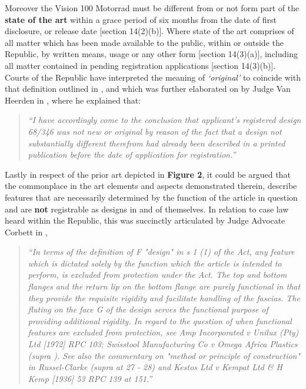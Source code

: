 \documentclass[11pt]{article}
\begin{document}
Moreover the Vision 100 Motorrad must be different from or not form part of the
\textbf{state of the art} within a grace period of six months from the date of first
disclosure, or release date [section 14(2)(b)]\cite{rsa93_designs_act}. Where
state of the art comprises of all matter which has been made available to the
public, within or outside the Republic, by written means, usage or any other
form [section 14(3)(a)]\cite{rsa93_designs_act}, including all matter contained in
pending registration applications [section 14(3)(b)]\cite{rsa93_designs_act}.\\

Courts of the Republic have interpreted the meaning of \emph{`original'} to coincide
with that definition outlined in \cite{rsa78_copyrightact}, and which was further
elaborated on by Judge Van Heerden in
\cite{vheerden71_xactics_v_tailored_containers}, where he explained that:
\begin{quote}
\textit{``I have accordingly come to the conclusion that applicant's registered design
68/346 was not new or original by reason of the fact that a design not substantially
different therefrom had already been described in a printed publication before the
date of application for registration.''}
\end{quote}

Lastly in respect of the prior art depicted in \textbf{Figure 2}, it could be argued
that the commonplace in the art elements and aspects demonstrated therein,
describe features that are necessarily determined by the function of the article
in question and are \textbf{not} registrable as designs in and of themselves. In
relation to case law heard within the Republic, this was succinctly articulated by
Judge Advocate Corbett in 
\cite{corbett84_homecraft_steel_v_sm_hare},

\begin{quote}
\textit{``In terms of the definition of F "design" in s 1 (1) of the
Act, any feature which is dictated solely by the function which the article is
intended to perform, is excluded from protection under the Act. The top and
bottom flanges and the return lip on the bottom flange are purely functional in
that they provide the requisite rigidity and facilitate handling of the fascias.
The fluting on the face G of the design serves the functional purpose of
providing additional rigidity. In regard to the question of when functional
features are excluded from protection, see Amp Incorporated v Unilux (Pty) Ltd
[1972] RPC 103; Swisstool Manufacturing Co v Omega Africa Plastics (supra ). See
also the commentary on "method or principle of construction" in Russel-Clarke
(supra at 27 - 28) and Kestos Ltd v Kempat Ltd \& H Kemp [1936] 53 RPC 139 at
151.''}
\end{quote}
\end{document}
